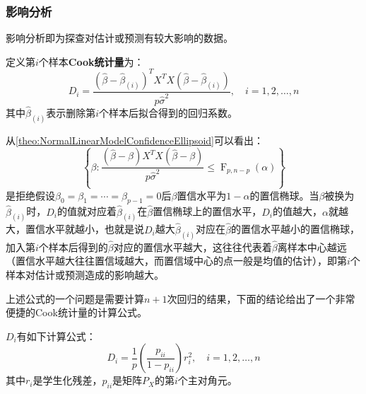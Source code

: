 \subsubsection{影响分析}
影响分析即为探查对估计或预测有较大影响的数据。
\begin{definition}
	定义第$i$个样本\textbf{Cook统计量}为：
	\begin{equation*}
		D_i=\frac{(\hat{\beta}-\hat{\beta}_{(i)})^TX^TX(\hat{\beta}-\hat{\beta}_{(i)})}{p\hat{\sigma}^2},\quad i=1,2,\dots,n
	\end{equation*}
	其中$\hat{\beta}_{(i)}$表示删除第$i$个样本后拟合得到的回归系数。
\end{definition}
\begin{note}
	从\cref{theo:NormalLinearModelConfidenceEllipsoid}可以看出：
	\begin{equation*}
		\left\{\beta:\frac{(\hat{\beta}-\beta)X^TX(\hat{\beta}-\beta)}{p\hat{\sigma}^2}\leqslant\operatorname{F}_{p,n-p}(\alpha)\right\}
	\end{equation*}
	是拒绝假设$\beta_0=\beta_1=\cdots=\beta_{p-1}=0$后$\beta$置信水平为$1-\alpha$的置信椭球。当$\beta$被换为$\hat{\beta}_{(i)}$时，$D_i$的值就对应着$\hat{\beta}_{(i)}$在$\hat{\beta}$置信椭球上的置信水平，$D_i$的值越大，$\alpha$就越大，置信水平就越小，也就是说$D_i$越大$\hat{\beta}_{(i)}$对应在$\hat{\beta}$的置信水平越小的置信椭球，加入第$i$个样本后得到的$\hat{\beta}$对应的置信水平越大，这往往代表着$\hat{\beta}$离样本中心越远（置信水平越大往往置信域越大，而置信域中心的点一般是均值的估计），即第$i$个样本对估计或预测造成的影响越大。\par
	上述公式的一个问题是需要计算$n+1$次回归的结果，下面的结论给出了一个非常便捷的Cook统计量的计算公式。
\end{note}
\begin{theorem}\label{theo:CookStatistic}
	$D_i$有如下计算公式：
	\begin{equation*}
		D_i=\frac{1}{p}\left(\frac{p_{ii}}{1-p_{ii}}\right)r_i^2,\quad i=1,2,\dots,n
	\end{equation*}
	其中$r_i$是学生化残差，$p_{ii}$是矩阵$P_X$的第$i$个主对角元。
\end{theorem}
